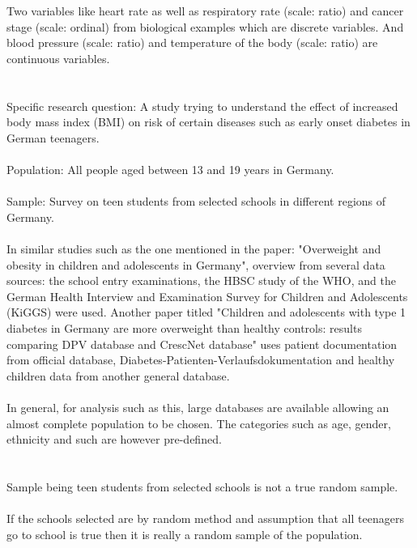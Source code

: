 \documentclass[a4paper,12pt]{article}
\newcommand{\<}{\langle}
\renewcommand{\>}{\rangle}
\newcommand{\1}{\mathbbm{1}}
\begin{document}
\section{}
Two variables like heart rate as well as respiratory rate (scale: ratio) and cancer stage (scale: ordinal) from biological examples which are discrete variables. And blood pressure (scale: ratio) and temperature of the body (scale: ratio) are continuous variables.
\section{}

Specific research question: A study trying to understand the effect of increased body mass index (BMI) on risk of certain diseases such as early onset diabetes in German teenagers. \\\\
Population: All people aged between 13 and 19 years in Germany. \\\\
Sample: Survey on teen students from selected schools in different regions of Germany. \\\\ 
In similar studies such as the one mentioned in the paper: "Overweight and obesity in children and adolescents in Germany", overview from several data sources: the school entry examinations, the HBSC study of the WHO, and the German Health Interview and Examination Survey for Children and Adolescents (KiGGS) were used.
Another paper titled "Children and adolescents with type 1 diabetes in Germany are more overweight than healthy controls: results comparing DPV database and CrescNet database" uses patient documentation from official database, Diabetes-Patienten-Verlaufsdokumentation and healthy children data from another general database.\\\\
In general, for analysis such as this, large databases are available allowing an almost complete population to be chosen. The categories such as age, gender, ethnicity and such are however pre-defined.
    

\section{}
Sample being teen students from selected schools is not a true random sample.\\\\
If the schools selected are by random method and assumption that all teenagers go to school is true then it is really a random sample of the population.
\end{document}

